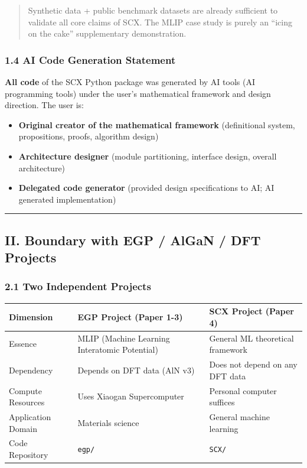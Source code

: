 \documentclass[
  12pt,
]{article}
\providecommand{\tightlist}{%
  \setlength{\itemsep}{0pt}\setlength{\parskip}{0pt}}
\begin{document}
\begin{quote}
Synthetic data + public benchmark datasets are already sufficient to validate all core claims of SCX. The MLIP case study is purely an ``icing on the cake'' supplementary demonstration.
\end{quote}

\subsubsection{1.4 AI Code Generation Statement}\label{ai-code-generation-statement}

\textbf{All code} of the SCX Python package was generated by AI tools (AI programming tools) under the user's mathematical framework and design direction. The user is:

\begin{itemize}
\tightlist
\item
  \textbf{Original creator of the mathematical framework} (definitional system, propositions, proofs, algorithm design)
\item
  \textbf{Architecture designer} (module partitioning, interface design, overall architecture)
\item
  \textbf{Delegated code generator} (provided design specifications to AI; AI generated implementation)
\end{itemize}

\begin{center}\rule{0.5\linewidth}{0.5pt}\end{center}

\subsection{II. Boundary with EGP / AlGaN / DFT Projects}\label{ii-boundary-with-egp-algan-dft-projects}

\subsubsection{2.1 Two Independent Projects}\label{two-independent-projects}

\begin{longtable}[]{@{}lll@{}}
\toprule\noalign{}
Dimension & EGP Project (Paper 1-3) & SCX Project (Paper 4) \\
\midrule\noalign{}
\endhead
\bottomrule\noalign{}
\endlastfoot
Essence & MLIP (Machine Learning Interatomic Potential) & General ML theoretical framework \\
Dependency & Depends on DFT data (AlN v3) & Does not depend on any DFT data \\
Compute Resources & Uses Xiaogan Supercomputer & Personal computer suffices \\
Application Domain & Materials science & General machine learning \\
Code Repository & \texttt{egp/} & \texttt{SCX/} \\
\end{longtable}
\end{document}
